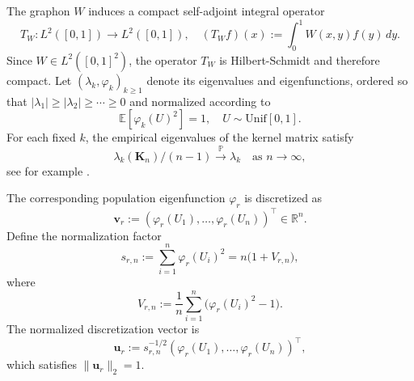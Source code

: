 \documentclass[11pt]{article}
\theoremstyle{plain}
\theoremstyle{remark}
\begin{document}
The graphon $W$ induces a compact self-adjoint integral operator
\begin{equation}
T_W : L^2([0,1]) \to L^2([0,1]), \quad (T_W f)(x) := \int_0^1 W(x,y)f(y)\,dy.
\label{eq:integral_operator}
\end{equation}
Since $W\in L^2([0,1]^2)$, the operator $T_W$ is Hilbert-Schmidt and therefore compact.
Let $(\lambda_k,\varphi_k)_{k\ge1}$ denote its eigenvalues and eigenfunctions, ordered so that $|\lambda_1|\ge|\lambda_2|\ge\cdots\ge0$ and normalized according to
\begin{equation}
\mathbb{E}[\varphi_k(U)^2]=1, \quad U\sim\mathrm{Unif}[0,1].
\label{eq:eigenfunction_normalization}
\end{equation}
For each fixed $k$, the empirical eigenvalues of the kernel matrix satisfy
\begin{equation}
\lambda_k(\mathbf{K}_n)/(n-1)\xrightarrow{\mathbb{P}}\lambda_k
\quad\text{as }n\to\infty,
\label{eq:eigenvalue_convergence}
\end{equation}
see for example \citet{koltchinskii2000random,zhu2024central}. 

The corresponding population eigenfunction $\varphi_r$ is discretized as
\begin{equation}
\mathbf{v}_r := (\varphi_r(U_1),\dots,\varphi_r(U_n))^\top\in\mathbb{R}^n.
\label{eq:unnormalized_eigenvector}
\end{equation}
Define the normalization factor
\begin{equation}
s_{r,n} := \sum_{i=1}^n\varphi_r(U_i)^2 = n\bigl(1+V_{r,n}\bigr),
\label{eq:normalization_factor}
\end{equation}
where
\begin{equation}
V_{r,n} := \frac{1}{n}\sum_{i=1}^n\bigl(\varphi_r(U_i)^2-1\bigr).
\label{eq:centered_eigenfunction_variance}
\end{equation}
The normalized discretization vector is
\begin{equation}
\mathbf{u}_r := s_{r,n}^{-1/2}(\varphi_r(U_1),\dots,\varphi_r(U_n))^\top,
\label{eq:normalized_eigenvector}
\end{equation}
which satisfies $\|\mathbf{u}_r\|_2=1$.
\end{document}
